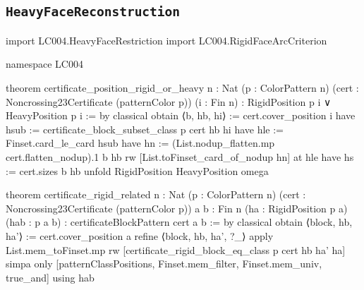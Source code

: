 \documentclass[11pt,reqno]{amsart}
\theoremstyle{definition}
\begin{document}
\subsection{\texorpdfstring{\texttt{HeavyFaceReconstruction}}{HeavyFaceReconstruction}}
\begin{LeanCode}
import LC004.HeavyFaceRestriction
import LC004.RigidFaceArcCriterion

namespace LC004

theorem certificate_position_rigid_or_heavy {n : Nat} (p : ColorPattern n)
    (cert : Noncrossing23Certificate (patternColor p)) (i : Fin n) :
    RigidPosition p i ∨ HeavyPosition p i := by
  classical
  obtain ⟨b, hb, hi⟩ := cert.cover_position i
  have hsub := certificate_block_subset_class p cert hb hi
  have hle := Finset.card_le_card hsub
  have hn := (List.nodup_flatten.mp cert.flatten_nodup).1 b hb
  rw [List.toFinset_card_of_nodup hn] at hle
  have hs := cert.sizes b hb
  unfold RigidPosition HeavyPosition
  omega

theorem certificate_rigid_related {n : Nat} (p : ColorPattern n)
    (cert : Noncrossing23Certificate (patternColor p))
    {a b : Fin n} (ha : RigidPosition p a) (hab : p a b) :
    certificateBlockPattern cert a b := by
  classical
  obtain ⟨block, hb, ha'⟩ := cert.cover_position a
  refine ⟨block, hb, ha', ?_⟩
  apply List.mem_toFinset.mp
  rw [certificate_rigid_block_eq_class p cert hb ha' ha]
  simpa only [patternClassPositions, Finset.mem_filter,
    Finset.mem_univ, true_and] using hab


\end{LeanCode}
\end{document}
